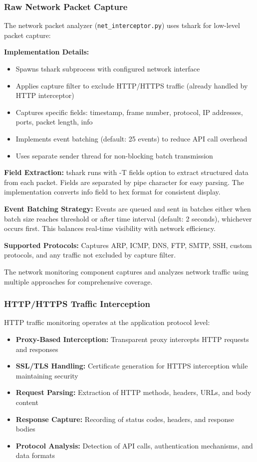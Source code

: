 \subsubsection{Raw Network Packet Capture}

The network packet analyzer (\texttt{net\_interceptor.py}) uses tshark for low-level packet capture:

\textbf{Implementation Details:}
\begin{itemize}
    \item Spawns tshark subprocess with configured network interface
    \item Applies capture filter to exclude HTTP/HTTPS traffic (already handled by HTTP interceptor)
    \item Captures specific fields: timestamp, frame number, protocol, IP addresses, ports, packet length, info
    \item Implements event batching (default: 25 events) to reduce API call overhead
    \item Uses separate sender thread for non-blocking batch transmission
\end{itemize}

\textbf{Field Extraction:}
tshark runs with -T fields option to extract structured data from each packet. Fields are separated by pipe character for easy parsing. The implementation converts info field to hex format for consistent display.

\textbf{Event Batching Strategy:}
Events are queued and sent in batches either when batch size reaches threshold or after time interval (default: 2 seconds), whichever occurs first. This balances real-time visibility with network efficiency.

\textbf{Supported Protocols:}
Captures ARP, ICMP, DNS, FTP, SMTP, SSH, custom protocols, and any traffic not excluded by capture filter.

The network monitoring component captures and analyzes network traffic using multiple approaches for comprehensive coverage.

\subsubsection{HTTP/HTTPS Traffic Interception}

HTTP traffic monitoring operates at the application protocol level:

\begin{itemize}
    \item \textbf{Proxy-Based Interception:} Transparent proxy intercepts HTTP requests and responses
    \item \textbf{SSL/TLS Handling:} Certificate generation for HTTPS interception while maintaining security
    \item \textbf{Request Parsing:} Extraction of HTTP methods, headers, URLs, and body content
    \item \textbf{Response Capture:} Recording of status codes, headers, and response bodies
    \item \textbf{Protocol Analysis:} Detection of API calls, authentication mechanisms, and data formats
\end{itemize}

